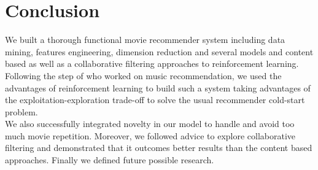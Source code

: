 \documentclass[letterpaper]{article}
\begin{document}
\section{Conclusion}

We built a thorough functional movie recommender system including data mining, features engineering, dimension reduction and several models and content based as well as a collaborative filtering approaches to reinforcement learning. \\

Following the step of \cite{main} who worked on music recommendation, we used the advantages of reinforcement learning to build such a system taking advantages of the exploitation-exploration trade-off to solve the usual recommender cold-start problem. \\

We also successfully integrated novelty in our model to handle and avoid too much movie repetition. Moreover, we followed \cite{main} advice to explore collaborative filtering and demonstrated that it outcomes better results than the content based approaches. Finally we defined future possible research.


\footnotesize


\end{document}

